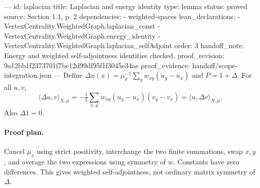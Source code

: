 ---
id: laplacian
title: Laplacian and energy identity
type: lemma
status: proved
source: Section 1.1, p. 2
dependencies:
- weighted-spaces
lean_declarations:
- VertexCentrality.WeightedGraph.laplacian_const
- VertexCentrality.WeightedGraph.energy_identity
- VertexCentrality.WeightedGraph.laplacian_selfAdjoint
order: 3
handoff_note: Energy and weighted self-adjointness identities checked.
proof_revision: 9a12bb1f2373701f7be12d99df95f1f3045e34ae
proof_evidence: handoff/scope-integration.json
---
Define $\Delta u(x)=\mu_x^{-1}\sum_yw_{xy}(u_y-u_x)$ and $P=1+\Delta$. For all $u,v$, \[\langle\Delta u,v\rangle_{X,\mu}=-\tfrac12\sum_{x,y}w_{xy}(u_y-u_x)(v_y-v_x)=\langle u,\Delta v\rangle_{X,\mu}.\] Also $\Delta 1=0$.

\paragraph{Proof plan.}
Cancel $\mu_x$ using strict positivity, interchange the two finite summations, swap $x,y$, and average the two expressions using symmetry of $w$. Constants have zero differences. This gives weighted self-adjointness, not ordinary matrix symmetry of $\Delta$.
